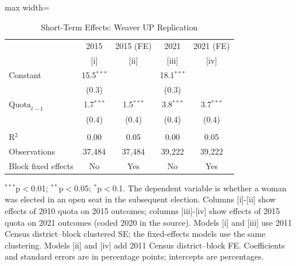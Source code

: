 
\begin{table}[htbp]
   \centering
   \scriptsize
   \begin{adjustbox}{max width=\linewidth}
      \begin{threeparttable}[b]
         \caption{\label{tab:weaver_short} Short-Term Effects: Weaver UP Replication}
         \bigskip
         \begin{tabular}{lcccc}
            \toprule
                                  & 2015         & 2015 (FE)   & 2021         & 2021 (FE) \\
                                  & [i]          & [ii]        & [iii]        & [iv]\\
            \midrule
            Constant              & 15.5$^{***}$ &             & 18.1$^{***}$ &   \\
                                  & (0.3)        &             & (0.3)        &   \\
            $\text{Quota}_{t-1}$  & 1.7$^{***}$  & 1.5$^{***}$ & 3.8$^{***}$  & 3.7$^{***}$\\
                                  & (0.4)        & (0.4)       & (0.4)        & (0.4)\\
             \\
            R$^2$                 & 0.00         & 0.05        & 0.00         & 0.05\\
            Observations          & 37,484       & 37,484      & 39,222       & 39,222\\
            Block fixed effects   & No           & Yes         & No           & Yes\\
            \bottomrule
         \end{tabular}

         \begin{tablenotes}
            \item $^{***}$p$<$0.01; $^{**}$p$<$0.05; $^{*}$p$<$0.1. The dependent variable is whether a woman was elected in an open seat in the subsequent election. Columns [i]-[ii] show effects of 2010 quota on 2015 outcomes; columns [iii]-[iv] show effects of 2015 quota on 2021 outcomes (coded 2020 in the source). Models [i] and [iii] use 2011 Census district--block clustered SE; the fixed-effects models use the same clustering. Models [ii] and [iv] add 2011 Census district--block FE. Coefficients and standard errors are in percentage points; intercepts are percentages.
         \end{tablenotes}
      \end{threeparttable}
   \end{adjustbox}
\end{table}


